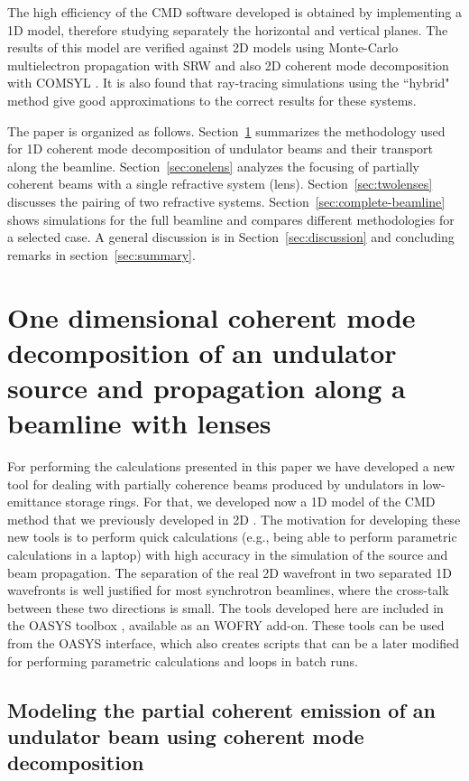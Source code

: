 \documentclass{iucr}              %
\begin{document}
The high efficiency of the CMD software developed is obtained by implementing a 1D model, therefore studying separately the horizontal and vertical planes. The results of this model are verified against 2D models using Monte-Carlo multielectron propagation with SRW and also 2D coherent mode decomposition with COMSYL \cite{codeCOMSYL}. It is also found that ray-tracing simulations using the ``hybrid" method \cite{codeHYBRID} give good approximations to the correct results for these systems. 

The paper is organized as follows. Section~\ref{sec:theory} summarizes the methodology used for 1D coherent mode decomposition of undulator beams and their transport along the beamline. Section~\ref{sec:onelens} analyzes the focusing of partially coherent beams with a single refractive system (lens). Section~\ref{sec:twolenses} discusses the pairing of two refractive systems. Section~\ref{sec:complete-beamline} shows simulations for the full beamline and compares different methodologies for a selected case. A general discussion is in Section~\ref{sec:discussion} and concluding remarks in section~\ref{sec:summary}. 


\section{One dimensional coherent mode decomposition of an undulator source and propagation along a beamline with lenses}\label{sec:theory}

For performing the calculations presented in this paper we have developed a new tool for dealing with partially coherence beams produced by undulators in low-emittance storage rings. For that, we developed now a 1D model of the CMD method that we previously developed in 2D \cite{glass2017}. The motivation for developing these new tools is to perform quick calculations (e.g., being able to perform parametric calculations in a laptop) with high accuracy in the simulation of the source and beam propagation. The separation of the real 2D wavefront in two separated 1D wavefronts is well justified for most synchrotron beamlines, where the cross-talk between these two directions is small. 
The tools developed here are included in the OASYS toolbox \cite{codeOASYS}, available as an WOFRY add-on. These tools can be used from the OASYS interface, which also creates scripts that can be a later modified for performing parametric calculations and loops in batch runs. 


\subsection{Modeling the partial coherent emission of an undulator beam using coherent mode decomposition}
\end{document}
